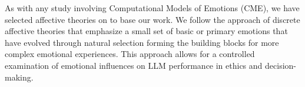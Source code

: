 \documentclass{article}
\begin{document}
As with any study involving Computational Models of Emotions (CME), we have selected affective theories on to base our work. We follow the approach of discrete affective theories \cite{hudlicka2017computational} that emphasize a small set of basic or primary emotions that have evolved through natural selection forming the building blocks for more complex emotional experiences. %
This approach allows for a controlled examination of emotional influences on LLM performance in ethics and decision-making.





\end{document}
